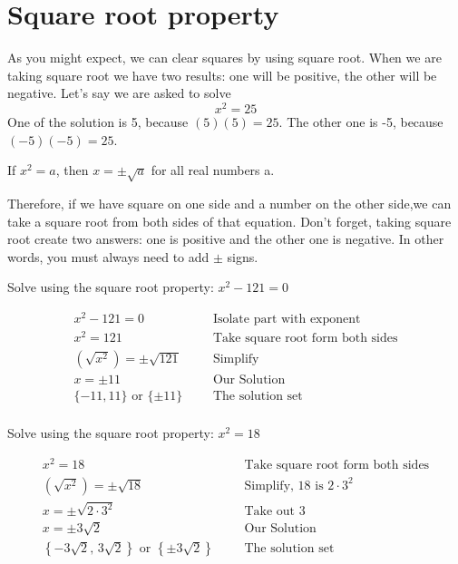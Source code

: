 \section{Square root property}
As you might expect, we can clear squares by using square root. 
When we are taking square root we have two results: one will be positive, the other will be 
negative. Let's say we are asked to solve \[
	x^2=25
	\]
One of the solution is 5, because $(5)(5)=25$. The other one is -5, because $(-5)(-5)=25$.
	\begin{tcolorbox}[title=The square root property,fonttitle=\bfseries,
	colframe=blue!70!red,
	colback=white]
	If $x^2=a$, then $x=\pm\sqrt{a}$ for all real numbers a.
	\end{tcolorbox}
Therefore, if we have square on one side and a number on the other side,we can take a square root from both sides of that equation. Don't forget, taking square root create two answers: one is positive and the other one  is negative. In other words, you must always need to add $\pm$ signs.
\begin{exa}
    Solve using the square root property: $x^2-121 =0$
\end{exa}
	\begin{align*}
		x^2-121 =0& &&\text{Isolate part with exponent}\\
		x^2 = 121& &&\text{Take square root form both sides}\\
		\left(\sqrt{x^2} \right) =\pm\sqrt{121}& &&\text{Simplify}\\
		x =\pm11&  &&\text{Our Solution}\\
		\{-11,11\}\,\, \text{or} \,\, \{\pm11\}& 
		&&\text{The solution set}\\
	\end{align*}
\begin{exa}
    Solve using the square root property: $x^2=18$
\end{exa}
	\begin{align*}
		x^2 = 18& &&\text{Take square root form both sides}\\
		\left(\sqrt{x^2} \right) =\pm\sqrt{18}&  &&\text{Simplify, $18$ is $2\cdot 3^2$}\\
		x =\pm\sqrt{2\cdot 3^2}& &&\text{Take out 3}\\
		x =\pm3\sqrt{2}& &&\text{Our Solution}\\
		\left\{-3\sqrt{2},\,3\sqrt{2}\right\}\,\, \text{or} \,\, \left\{\pm 3\sqrt{2}\right\}& 
		&&\text{The solution set}\\
	\end{align*}
